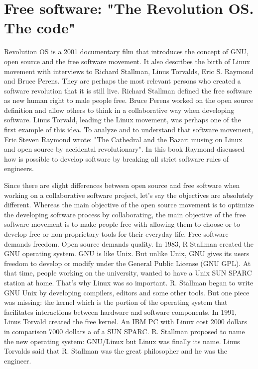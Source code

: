  
   
   
    
     
    
    
   
 \section*{Free software: "The Revolution OS. The code"}
 Revolution OS is a 2001 documentary film that introduces the concept of GNU, 
 open source and the free software movement. It also describes the birth of Linux movement
 with  interviews to  Richard Stallman, Linus Torvalds, 
 Eric S. Raymond and Bruce Perens.
 They are perhaps the most relevant persons who created a software revolution that it is still live.  
 Richard Stallman defined the free software as new human right to male people free. 
 Bruce Perens worked on the open source definition and allow others to think in a collaborative way when 
 developing software. Linus Torvald,  leading the Linux movement, was perhaps one of the first example of this idea. 
 To analyze and to understand that software movement, Eric Steven Raymond wrote: "The Cathedral and the Bazar: 
 musing on Linux and open source by accidental revolutionary". 
 In this book Raymond discussed  how is possible to develop software by breaking all strict software rules of engineers.  
 
 Since there are slight differences between open source and free software when working on a collaborative
 software project,  let's say the objectives are absolutely different.  Whereas the main objective of the open source 
 movement is to optimize the developing software process by collaborating, the main objective of 
 the free software movement is to make people free with allowing them to choose or to develop free or non-proprietary
 tools for their everyday life.  Free software demands freedom. Open source demands quality. 
 In 1983, R Stallman created the GNU operating system. 
 GNU is like Unix. But unlike Unix, GNU gives its users freedom to develop or modify 
 under the  General Public License (GNU GPL).
 At that time, people working on the university, wanted to have a Unix SUN SPARC station at home. That's why Linux was so important. 
 R. Stallman  began to write GNU Unix by developing compilers, editors and some other tools. But one piece was missing: the kernel which is 
 the portion of the operating system that facilitates interactions between hardware and software components.  In 1991, Linus Torvald created 
 the free kernel. 
 An IBM PC with Linux cost 2000 dollars  in comparison  7000 dollars a of a SUN SPARC. 
 R. Stallman proposed to name the new operating system:  GNU/Linux  but Linux was finally its name.  
 Linus Torvalds said that R. Stallman was the great philosopher and he was the engineer. 
 
